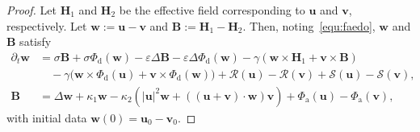 \documentclass[11pt, reqno]{amsart}
\theoremstyle{definition}
\numberwithin{equation}{section}
\newcommand{\bff}{\boldsymbol}
\begin{document}
\begin{proof}
Let $\bff{H}_1$ and $\bff{H}_2$ be the effective field corresponding to $\bff{u}$ and $\bff{v}$, respectively. Let $\bff{w}:=\bff{u}-\bff{v}$ and $\bff{B}:=\bff{H}_1-\bff{H}_2$. Then, noting~\eqref{equ:faedo}, $\bff{w}$ and $\bff{B}$ satisfy
\begin{align}
    \label{equ:w H1}
    \partial_t \bff{w} 
    &= 
    \sigma \bff{B}
    +
    \sigma \Phi_{\mathrm{d}}(\bff{w})
    -
    \varepsilon \Delta \bff{B}
    -
    \varepsilon \Delta \Phi_{\mathrm{d}}(\bff{w})
    -
    \gamma (\bff{w}\times \bff{H}_1 + \bff{v} \times \bff{B})
    \nonumber\\
    &\quad
    -
    \gamma \big(\bff{w}\times \Phi_{\mathrm{d}}(\bff{u}) + \bff{v}\times \Phi_{\mathrm{d}}(\bff{w})\big)
    +
    \mathcal{R}(\bff{u}) - \mathcal{R}(\bff{v})
    +
     \mathcal{S}(\bff{u}) - \mathcal{S}(\bff{v}),
    \\
    \label{equ:B eq}
    \bff{B}
    &=
    \Delta \bff{w}
    +
    \kappa_1 \bff{w} 
    -
    \kappa_2 \left(|\bff{u}|^2 \bff{w} + ((\bff{u}+\bff{v})\cdot \bff{w}) \bff{v}\right)
    +
    \Phi_{\mathrm{a}}(\bff{u})-\Phi_{\mathrm{a}}(\bff{v}),
\end{align}
with initial data $\bff{w}(0)=\bff{u}_0-\bff{v}_0$.


\end{proof}
\end{document}

